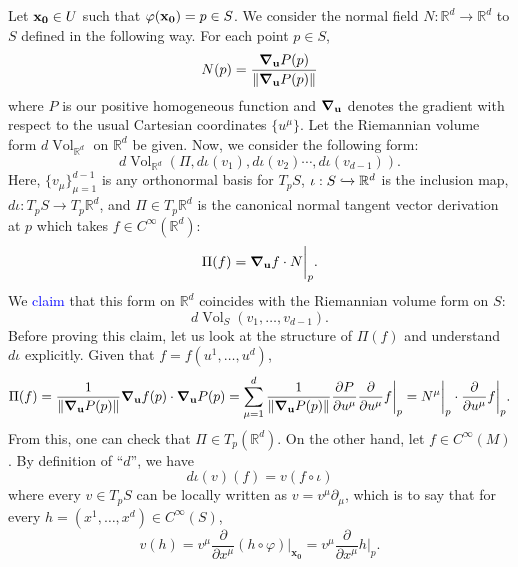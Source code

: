 \documentclass{article}
\theoremstyle{definition}
\newcommand{\p}{\partial}
\newcommand{\R}{\mathbb{R}}
\newcommand{\f}[2]{\frac{#1}{#2}}
\theoremstyle{theorem}
\newcommand{\Vol}{\operatorname{Vol}}
\begin{document}
Let ${\bf{x_0}}\in U$ such that $\varphi({\bf{x_0}}) = p\in S$. We consider the normal field $N : \R^d \to \R^d$ to $S$ defined in the following way. For each point $p \in S$, 
\begin{equation*}
    N(p) = \f{\grad_{\bf{u}} P(p)}{\norm{\grad_{\bf{u}} P(p)}}
\end{equation*}
where $P$ is our positive homogeneous function and $\grad_{\bf{u}}$ denotes the gradient with respect to the usual Cartesian coordinates $\{u^\mu\}$. Let the Riemannian volume form $d\Vol_{\R^d}$ on $\R^d$ be given. Now, we consider the following form:
\begin{equation*}
d\Vol_{\mathbb{R}^d} (\Pi, d\iota(v_1),d\iota(v_2)\cdots,d\iota(v_{d-1})).
\end{equation*}
Here, $\{ v_\mu \}_{\mu = 1}^{d-1}$ is any orthonormal basis for $T_pS$, $\iota: S\xhookrightarrow{} \R^d$ is the inclusion map,  $d\iota : T_pS \to T_p \R^d$, and $\Pi\in T_p\mathbb{R}^d$ is the canonical normal tangent vector derivation at $p$ which takes $f\in C^{\infty}(\mathbb{R}^d)$:
\begin{equation*}
\Pi(f) =\grad_{\bf{u}} f \cdot N \bigg\vert_{p}.
\end{equation*}
We \textcolor{blue}{claim} that this form on $\R^d$ coincides with the Riemannian volume form on $S$:
\begin{equation*}
    d\Vol_S(v_1,\dots,v_{d-1}).
\end{equation*}
Before proving this claim, let us look at the structure of $\Pi(f)$ and understand $d\iota$ explicitly. Given that $f = f(u^1,\dots,u^d)$, 
\begin{equation*}
\Pi(f) = \f{1}{\norm{\grad_{\bf{u}} P(p)}} \grad_{\bf{u}} f(p) \cdot \grad_{\bf{u}} P(p) 
= \sum^d_{\mu = 1} \f{1}{\norm{\grad_{\bf{u}} P(p)}} \f{\p P}{\p u^\mu} \f{\p}{\p u^\mu} f \bigg\vert_{p} 
= N^\mu\bigg\vert_{p}\cdot \f{\p}{\p u^\mu}f\bigg\vert_{p}.
\end{equation*}
From this, one can check that $\Pi \in T_p(\R^d)$. On the other hand, let $f\in C^{\infty}(M)$. By definition of ``$d$'', we have
\begin{equation*}
d\iota(v)(f)=v(f\circ\iota)
\end{equation*}
where every $v\in T_pS$ can be locally written as 
$v =v^\mu \p_\mu$, which is to say that for every $h = (x^1,\dots,x^{d})\in C^\infty(S)$, 
\begin{equation*}
    v(h) = v^\mu \f{\p}{\p x^\mu} (h\circ \varphi)\bigg\vert_{\mathbf{x_0}} = v^\mu \f{\p}{\p x^\mu} h \bigg\vert_{p}.
\end{equation*}
\end{document}
